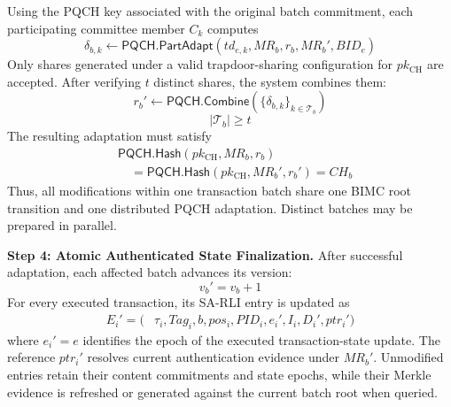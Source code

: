 \documentclass[lettersize,journal]{IEEEtran}
\begin{document}
    Using the PQCH key associated with the
    original batch commitment, each participating
    committee member $C_k$ computes
    \begin{equation}
    \delta_{b,k}\leftarrow
    \mathsf{PQCH.PartAdapt}
    (td_{e,k},MR_b,r_b,MR_b',BID_e)
    \end{equation}
    Only shares generated under a valid
    trapdoor-sharing configuration for
    $pk_{\mathrm{CH}}$ are accepted. After
    verifying $t$ distinct shares, the system
    combines them:
    \begin{equation}
    r_b'\leftarrow
    \mathsf{PQCH.Combine}
    (\{\delta_{b,k}\}_{k\in\mathcal{T}_b})
    \end{equation}
    \begin{equation}
    |\mathcal{T}_b|\geq t
    \end{equation}
    The resulting adaptation must satisfy
    \begin{equation}
    \begin{aligned}
    &\mathsf{PQCH.Hash}
    (pk_{\mathrm{CH}},MR_b,r_b)\\
    &\quad=
    \mathsf{PQCH.Hash}
    (pk_{\mathrm{CH}},MR_b',r_b')
    =CH_b
    \end{aligned}
    \end{equation}
    Thus, all modifications within one
    transaction batch share one BIMC root
    transition and one distributed PQCH
    adaptation. Distinct batches may be
    prepared in parallel.
    
    \medskip
    \noindent\textbf{Step 4: Atomic Authenticated
    State Finalization.}
    After successful adaptation, each affected
    batch advances its version:
    \begin{equation}
    v_b'=v_b+1
    \end{equation}
    For every executed transaction, its SA-RLI
    entry is updated as
    \begin{equation}
    \begin{aligned}
    E_i'=\big(&\tau_i,Tag_i,b,pos_i,PID_i,e_i',I_i,D_i',ptr_i'\big)
    \end{aligned}
    \end{equation}
    where $e_i'=e$ identifies the epoch of
    the executed transaction-state update.
    The reference $ptr_i'$ resolves current
    authentication evidence under $MR_b'$.
    Unmodified entries retain their content
    commitments and state epochs, while their
    Merkle evidence is refreshed or generated
    against the current batch root when queried.
    
\end{document}
